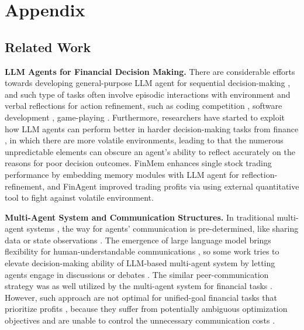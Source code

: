 \section{Appendix}

\subsection{Related Work}
\label{related_work}
\textbf{LLM Agents for Financial Decision Making.} There are considerable efforts towards developing general-purpose LLM agent for sequential decision-making \cite{shinn2023reflexion, zhao2024expel}, and such type of tasks often involve episodic interactions with environment and verbal reflections for action refinement, such as coding competition \cite{li2022competition, chen2022codet}, software development \cite{qian2023communicative, hong2023metagpt}, game-playing \cite{xu2023language, ma2023large}. Furthermore, researchers have started to exploit how LLM agents can perform better in harder decision-making tasks from finance \cite{de2023llm,zhao2024revolutionizing, liu2024fmdllama, cao2024risklabs, xie2024open}, in which there are more volatile environments, leading to that the numerous unpredictable elements can obscure an agent's ability to reflect accurately on the reasons for poor decision outcomes. {FinMem} \cite{yu2023finmem} enhances single stock trading performance by embedding memory modules with LLM agent for reflection-refinement, 
and FinAgent \cite{zhang2024finagent} improved trading profits via using external quantitative tool to fight against volatile environment. %

\textbf{Multi-Agent System and Communication Structures.}
In traditional multi-agent systems \cite{canese2021multi,zhang2021multi}, the way for agents' communication is pre-determined, like sharing data or state observations \cite{foerster2016learning,lin2021learning,kim2020communication,zhu2022survey, yao2024reinforcement, li2022impact}. The emergence of large language model brings flexibility for human-understandable communications \cite{wang2023adapting,park2023generative,hong2023metagpt,mandi2023roco}, so some work tries to elevate decision-making ability of LLM-based multi-agent system by letting agents engage in discussions \cite{zhang2023building,wu2023autogen} or debates \cite{du2023improving, chan2023chateval}. The similar peer-communication strategy was as well utilized by the multi-agent system for financial tasks \cite{xing2024designing,de2024optimized,wan2024enhancing}. However, such approach are not optimal for unified-goal financial tasks that prioritize profits \cite{liuai2024}, because they suffer from potentially ambiguous optimization objectives and are unable to control the unnecessary communication costs \cite{bolton1994firm}.

